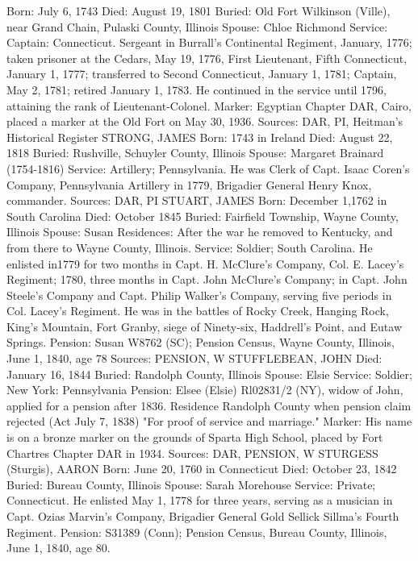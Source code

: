 Born: July 6, 1743
Died: August 19, 1801
Buried: Old Fort Wilkinson (Ville), near Grand Chain, Pulaski County, Illinois
Spouse: Chloe Richmond
Service: Captain: Connecticut. Sergeant in Burrall's Continental Regiment, Jan­uary, 1776; taken prisoner at the Cedars, May 19, 1776, First Lieutenant, Fifth Connecticut, January 1, 1777; transferred to Second Connecticut, Jan­uary 1, 1781; Captain, May 2, 1781; retired January 1, 1783. He continued in the service until 1796, attaining the rank of Lieutenant-Colonel. 
Marker: Egyptian Chapter DAR, Cairo, placed a marker at the Old Fort on May 30, 1936.
Sources: DAR, PI, Heitman's Historical Register 
STRONG, JAMES
Born: 1743 in Ireland
Died: August 22, 1818
Buried: Rushville, Schuyler County, Illinois
Spouse: Margaret Brainard (1754-1816) 
Service: Artillery; Pennsylvania. He was Clerk of Capt. Isaac Coren's Company, Pennsylvania Artillery in 1779, Brigadier General Henry Knox, commander.
Sources: DAR, PI 
STUART, JAMES
Born: December 1,1762 in South Carolina
Died: October 1845
Buried: Fairfield Township, Wayne County, Illinois
Spouse: Susan Residences: After the war he removed to Kentucky, and from there to Wayne County, Illinois.
Service: Soldier; South Carolina. He enlisted in1779 for two months in Capt. H. McClure's Company, Col. E. Lacey's Regiment; 1780, three months in Capt. John McClure's Company; in Capt. John Steele's Company and Capt. Philip Walker's Company, serving five periods in Col. Lacey's Regiment. He was in the battles of Rocky Creek, Hanging Rock, King's Mountain, Fort Granby, siege of Ninety-six, Haddrell's Point, and Eutaw Springs. 
Pension: Susan W8762 (SC); Pension Census, Wayne County, Illinois, June 1, 1840, age 78 
Sources: PENSION, W 
STUFFLEBEAN, JOHN
Died: January 16, 1844
Buried: Randolph County, Illinois
Spouse: Elsie
Service: Soldier; New York: Pennsylvania
Pension: Elsee (Elsie) Rl02831/2 (NY), widow of John, applied for a pension after 1836. Residence Randolph County when pension claim rejected (Act July 7, 1838) "For proof of service and marriage."
Marker: His name is on a bronze marker on the grounds of Sparta High School, placed by Fort Chartres Chapter DAR in 1934.
Sources: DAR, PENSION, W 
STURGESS (Sturgis), AARON
Born: June 20, 1760 in Connecticut
Died: October 23, 1842
Buried: Bureau County, Illinois
Spouse: Sarah Morehouse
Service: Private; Connecticut. He enlisted May 1, 1778 for three years, serving as a musician in Capt. Ozias Marvin's Company, Brigadier General Gold Sellick Sillma's Fourth Regiment.
Pension: S31389 (Conn); Pension Census, Bureau County, Illinois, June 1, 1840, age 80.
